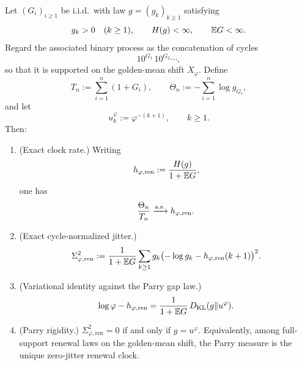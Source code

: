 \begin{theorem}\label{thm:golden-renewal-rigidity}
Let $(G_i)_{i\ge 1}$ be i.i.d.\ with law $g=(g_k)_{k\ge 1}$ satisfying
\[
g_k>0\quad(k\ge 1),
\qquad
H(g)<\infty,
\qquad
\mathbb{E} G<\infty.
\]
Regard the associated binary process as the concatenation of cycles
\[
10^{G_1}\,10^{G_2}\cdots,
\]
so that it is supported on the golden-mean shift $X_\varphi$. Define
\[
T_n:=\sum_{i=1}^n(1+G_i),
\qquad
\Theta_n:=-\sum_{i=1}^n\log g_{G_i},
\]
and let
\[
u^\varphi_k:=\varphi^{-(k+1)},
\qquad k\ge 1.
\]
Then:
\begin{enumerate}[label=\textup{(\roman*)},leftmargin=*,itemsep=4pt]
\item \textup{(Exact clock rate.)} Writing
\begin{equation}\label{eq:golden-renewal-rate}
h_{\varphi,\mathrm{ren}}
:=
\frac{H(g)}{1+\mathbb{E} G},
\end{equation}
one has
\[
\frac{\Theta_n}{T_n}\xrightarrow{\textup{a.s.}} h_{\varphi,\mathrm{ren}}.
\]
\item \textup{(Exact cycle-normalized jitter.)}
\begin{equation}\label{eq:golden-renewal-jitter}
\Sigma_{\varphi,\mathrm{ren}}^2
:=
\frac{1}{1+\mathbb{E} G}
\sum_{k\ge 1}g_k\bigl(-\log g_k-h_{\varphi,\mathrm{ren}}(k+1)\bigr)^2.
\end{equation}
\item \textup{(Variational identity against the Parry gap law.)}
\begin{equation}\label{eq:golden-renewal-kl}
\log\varphi-h_{\varphi,\mathrm{ren}}
=
\frac{1}{1+\mathbb{E} G}\,
D_{\mathrm{KL}}(g\Vert u^\varphi).
\end{equation}
\item \textup{(Parry rigidity.)} $\Sigma_{\varphi,\mathrm{ren}}^2=0$ if and only if $g=u^\varphi$. Equivalently, among full-support renewal laws on the golden-mean shift, the Parry measure is the unique zero-jitter renewal clock.
\end{enumerate}
\end{theorem}

